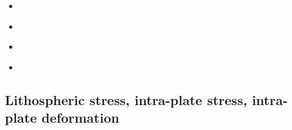 \begin{scriptsize}
\begin{itemize}
\item[\nineteeneightyseven]
\textcite{kamz87} \\
\item[\twothousandeight]
\textcite{hupc08} \\
\item[\twothousandseventeen]
\textcite{moyu17} \\
\item[\twothousandeighteen]
\textcite{moyu18} \\
\end{itemize}
\end{scriptsize}

\subsection{Lithospheric stress, intra-plate stress, intra-plate deformation}

